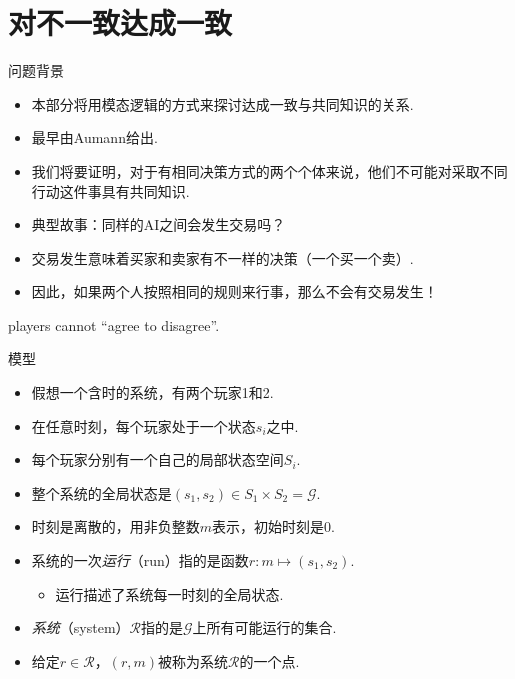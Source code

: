 \section{对不一致达成一致}
\begin{frame}{问题背景}
\begin{itemize}
    \item 本部分将用模态逻辑的方式来探讨达成一致与共同知识的关系.
    \item 最早由Aumann给出.
    \item 我们将要证明，对于有相同决策方式的两个个体来说，他们不可能对采取不同行动这件事具有共同知识.
    \item 典型故事：同样的AI之间会发生交易吗？
    \item 交易发生意味着买家和卖家有不一样的决策（一个买一个卖）.
    \item 因此，如果两个人按照相同的规则来行事，那么不会有交易发生！
\end{itemize}
\begin{center}
    players cannot ``agree to disagree''.
\end{center}
\end{frame}

\begin{frame}{模型}
\begin{itemize}
    \item 假想一个含时的系统，有两个玩家1和2.
    \item 在任意时刻，每个玩家处于一个状态$s_i$之中.
    \item 每个玩家分别有一个自己的局部状态空间$S_i$.
    \item 整个系统的全局状态是$(s_1,s_2)\in S_1\times S_2=\mathcal G$.
    \item 时刻是离散的，用非负整数$m$表示，初始时刻是$0$.
    \item 系统的一次\emph{运行}（run）指的是函数$r:m\mapsto(s_1,s_2)$.
    \begin{itemize}
        \item 运行描述了系统每一时刻的全局状态.
    \end{itemize}
    \item \emph{系统}（system）$\mathcal R$指的是$\mathcal G$上所有可能运行的集合.
    \item 给定$r\in\mathcal R$，$(r,m)$被称为系统$\mathcal R$的一个点.
\end{itemize}
\end{frame}

